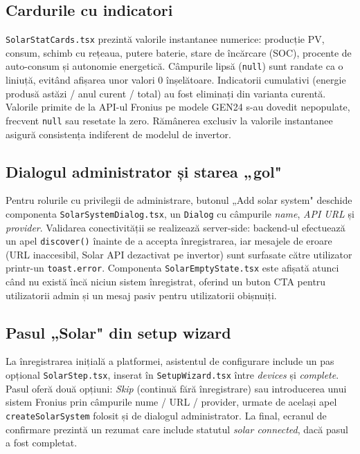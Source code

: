 \subsection{Cardurile cu indicatori}
\texttt{SolarStatCards.tsx} prezintă valorile instantanee numerice: producție PV, consum, schimb cu rețeaua, putere baterie, stare de încărcare (SOC), procente de auto-consum și autonomie energetică. Câmpurile lipsă (\texttt{null}) sunt randate ca o liniuță, evitând afișarea unor valori 0 înșelătoare. Indicatorii cumulativi (energie produsă astăzi / anul curent / total) au fost eliminați din varianta curentă. Valorile primite de la API-ul Fronius pe modele GEN24 s-au dovedit nepopulate, frecvent \texttt{null} sau resetate la zero. Rămânerea exclusiv la valorile instantanee asigură consistența indiferent de modelul de invertor.

\subsection{Dialogul administrator și starea „gol"}
Pentru rolurile cu privilegii de administrare, butonul „Add solar system" deschide componenta \texttt{SolarSystemDialog.tsx}, un \texttt{Dialog} cu câmpurile \emph{name}, \emph{API URL} și \emph{provider}. Validarea conectivității se realizează server-side: backend-ul efectuează un apel \texttt{discover()} înainte de a accepta înregistrarea, iar mesajele de eroare (URL inaccesibil, Solar API dezactivat pe invertor) sunt surfasate către utilizator printr-un \texttt{toast.error}. Componenta \texttt{SolarEmptyState.tsx} este afișată atunci când nu există încă niciun sistem înregistrat, oferind un buton CTA pentru utilizatorii admin și un mesaj pasiv pentru utilizatorii obișnuiți.

\subsection{Pasul „Solar" din setup wizard}
La înregistrarea inițială a platformei, asistentul de configurare include un pas opțional \texttt{SolarStep.tsx}, inserat în \texttt{SetupWizard.tsx} între \emph{devices} și \emph{complete}. Pasul oferă două opțiuni: \emph{Skip} (continuă fără înregistrare) sau introducerea unui sistem Fronius prin câmpurile nume / URL / provider, urmate de același apel \texttt{createSolarSystem} folosit și de dialogul administrator. La final, ecranul de confirmare prezintă un rezumat care include statutul \emph{solar connected}, dacă pasul a fost completat.

